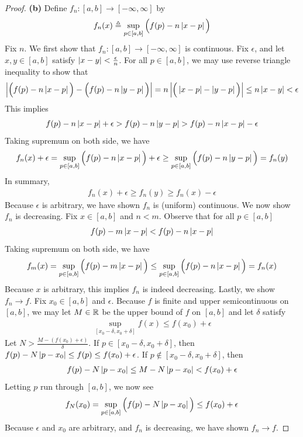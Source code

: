 \documentclass{report}
\begin{document}
\begin{proof}
\textbf{(b)} Define  $f_n:[a,b]\rightarrow [-\infty,\infty]$ by  
\begin{align*}
f_n(x)\triangleq \sup_{p \in [a,b]}\Big(f(p)-n\left|x-p\right| \Big)
\end{align*}
Fix  $n$. We first show that $f_n:[a,b]\rightarrow [-\infty,\infty]$ is continuous. Fix $\epsilon $, and let $x,y\in [a,b]$ satisfy $\left|x-y\right|< \frac{\epsilon}{n}$. For all $p\in [a,b]$, we may use reverse triangle inequality to show that 
\begin{align*}
\left|\Big(f(p)-n \left|x-p\right| \Big)- \Big( f(p)-n\left|y-p\right| \Big)\right|= n \left|\Big(\left|x-p\right|-\left|y-p\right| \Big)\right|\leq n \left|x-y\right|< \epsilon 
\end{align*}
This implies 
\begin{align*}
f(p)-n\left| x-p\right|+\epsilon > f(p)-n \left|y-p\right| >f(p)-n \left|x-p\right|-\epsilon 
\end{align*}
Taking supremum on both side, we have  
\begin{align*}
f_n(x)+\epsilon =\sup_{p \in [a,b]} \Big(f(p)-n\left|x-p\right| \Big)+\epsilon \geq \sup_{p\in [a,b]} \Big( f(p)-n\left|y-p\right| \Big)=f_n(y)
\end{align*}
In summary, 
\begin{align*}
f_n(x)+\epsilon \geq f_n(y) \geq f_n(x)-\epsilon 
\end{align*}
Because  $\epsilon $ is arbitrary, we have shown $f_n$ is (uniform) continuous. We now show $f_n$ is decreasing. Fix $x\in [a,b]$ and $n<m$. Observe that for all $p \in [a,b]$ 
\begin{align*}
f(p)-m \left|x-p\right|< f(p)-n \left|x-p\right|
\end{align*}
Taking supremum on both side, we have 
\begin{align*}
f_m(x)=\sup_{p \in [a,b]}\Big(f(p)-m \left|x-p\right| \Big) \leq \sup_{p \in [a,b]}\Big(f(p)-n \left|x-p\right| \Big)=f_n(x)
\end{align*}
Because $x$ is arbitrary, this implies $f_n$ is indeed decreasing. Lastly, we show $f_n\to f$. Fix $x_0\in [a,b]$ and $\epsilon $. Because $f$ is finite and upper semicontinuous on $[a,b]$, we may let $M\in\mathbb{R} $ be the upper bound of $f$ on $[a,b]$ and let $\delta$ satisfy 
\begin{align*}
\sup_{[x_0-\delta,x_0+\delta]}f(x)\leq f(x_0)+ \epsilon 
\end{align*}
Let $N> \frac{M-(f(x_0)+\epsilon )}{\delta}$. If $p \in [x_0-\delta,x_0+\delta]$, then $f(p)-N\left|p-x_0\right|\leq f(p)\leq f(x_0)+\epsilon $. If $p\not\in [x_0-\delta,x_0+\delta]$, then 
\begin{align*}
f(p)- N \left|p-x_0\right|\leq M-N \left|p-x_0\right|<f(x_0)+\epsilon 
\end{align*}
Letting $p$ run through $[a,b]$, we now see 
\begin{align*}
f_N(x_0)=\sup_{p \in [a,b]}\Big(f(p)-N\left|p-x_0\right| \Big)\leq f(x_0)+\epsilon 
\end{align*}
Because $\epsilon $ and $x_0$ are arbitrary, and $f_n$ is decreasing, we have shown  $f_n \to f$.
\end{proof}
\end{document}
